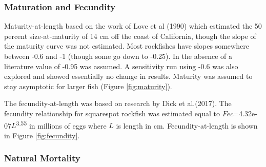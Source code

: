 \documentclass[11pt,
  english,
  a4paper,
]{article}
\begin{document}
\leavevmode\tagmcend\tagstructend\par


\hypertarget{maturation-and-fecundity}{%
\subsubsection{Maturation and Fecundity}\label{maturation-and-fecundity}}

\leavevmode\tagmcend\tagstructend


Maturity-at-length based on the work of Love et al {(1990)\leavevmode\tagmcend\tagstructend} which estimated the 50 percent size-at-maturity of 14 cm off the coast of California, though the slope of the maturity curve was not estimated. Most rockfishes have slopes somewhere between -0.6 and -1 (though some go down to -0.25). In the absence of a literature value of -0.95 was assumed. A sensitivity run using -0.6 was also explored and showed essentially no change in results. Maturity was assumed to stay asymptotic for larger fish (Figure \ref{fig:maturity}).

\leavevmode\tagmcend\tagstructend\par


The fecundity-at-length was based on research by Dick et al.{(2017)\leavevmode\tagmcend\tagstructend}. The fecundity relationship for squarespot rockfish was estimated equal to {\(Fec\)\leavevmode\tagmcend\tagstructend}=4.32e-07{\(L\)\leavevmode\tagmcend\tagstructend}\textsuperscript{3.55} in millions of eggs where {\(L\)\leavevmode\tagmcend\tagstructend} is length in cm. Fecundity-at-length is shown in Figure \ref{fig:fecundity}.

\leavevmode\tagmcend\tagstructend\par


\hypertarget{natural-mortality}{%
\subsubsection{Natural Mortality}\label{natural-mortality}}
\end{document}
